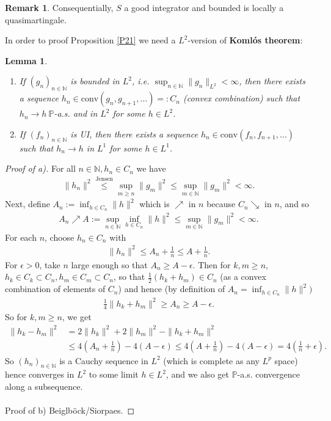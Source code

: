 \documentclass[12pt,a4paper, twoside]{article}
\newtheorem{lem}{Lemma}[section]
\theoremstyle{definition}
\newtheorem{rem}{Remark}[section]
\newcommand{\PP}{\mathbb{P}} %
\begin{document}
\begin{rem} Consequentially, $S$ a good integrator and bounded is locally a quasimartingale. 
\end{rem}
In order to proof Proposition \ref{P21} we need a $L^2$-version of \textbf{Komlós theorem}: 
\begin{lem} \label{L22} \
\begin{enumerate}[label=(\alph*)]
\item If $(g_n)_{n \in \mathbb{N}}$ is bounded in $L^2$, i.e. $\sup_{n \in \mathbb{N}} \|g_n\|_{L^2}< \infty$, then there exists a sequence $h_n \in \text{conv}(g_n,g_{n+1}, \dots )=:C_n$ (convex combination) such that $h_n \to h \ \PP$-a.s. and in $L^2$ for some $h \in L^2$. 
\item If $(f_n)_{n \in \mathbb{N}}$ is UI, then there exists a sequence $h_n \in \text{conv}(f_n, f_{n+1}, \dots )$ such that $h_n \to h$ in $L^1$ for some $h \in L^1$. 
\end{enumerate}
\end{lem}
\newpage
\begin{proof}[Proof of a)] For all $n \in \mathbb{N}, h_n \in C_n$ we have
\begin{align*}
\|h_n\|^2 \overset{\text{Jensen}}\leq \sup_{m \geq n } \|g_m\|^2 \leq \sup_{m \in \mathbb{N}} \|g_m\|^2 < \infty.
\end{align*}
Next, define $A_n:= \inf_{h \in C_n} \|h\|^2$ which is $\nearrow$ in $n$ because $C_n \searrow$ in $n$, and so 
\begin{align*}
A_n \nearrow A := \sup_{n \in \mathbb{N}} \inf_{h \in C_n} \|h\|^2 \leq \sup_{m \in \mathbb{N}} \|g_m\|^2 < \infty.
\end{align*}
For each $n$, choose $h_n \in C_n$ with 
\begin{align*}
\|h_n\|^2 \leq A_n + \frac{1}{n} \leq A +\frac{1}{n}.
\end{align*}
For $\epsilon>0$, take $n$ large enough so that $A_n \geq A- \epsilon$. Then for $k,m \geq n$, $h_k \in C_k \subset C_n, h_m \in C_m \subset C_n$, so that $\frac{1}{2}(h_k+h_m) \in C_n$ (as a convex combination of elements of $C_n$) and hence (by definition of $A_n= \inf_{h \in C_n} \|h\|^2)$
\begin{align*}
\frac{1}{4} \|h_k + h_m\|^2 \geq A_n \geq A- \epsilon.
\end{align*}
So for $k,m \geq n$, we get 
\begin{align*}
\|h_k-h_m\|^2 &= 2 \|h_k\|^2 + 2 \|h_m\|^2 - \|h_k + h_m\|^2  \\
& \leq 4 \left(A_n + \frac{1}{n}\right) - 4(A- \epsilon) \leq 4\left(A+ \frac{1}{n}\right) -4(A- \epsilon) = 4 \left( \frac{1}{n} + \epsilon \right).
\end{align*}
So $(h_n)_{n \in \mathbb{N}}$ is a Cauchy sequence in $L^2$ (which is complete as any $L^p$ space) hence converges in $L^2$ to some limit $h \in L^2$, and we also get $\PP$-a.s. convergence along a subsequence. 
\\
\\
Proof of b) Beiglböck/Siorpaes.
\end{proof}
\end{document}
